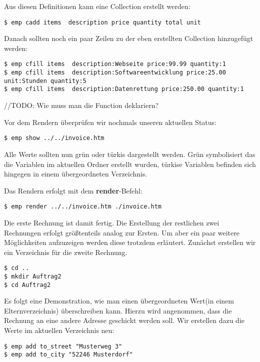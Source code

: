 Aus diesen Definitionen kann eine Collection erstellt werden:
\begin{lstlisting}[style=Bash]
$ emp cadd items  description price quantity total unit
\end{lstlisting}

Danach sollten noch ein paar Zeilen zu der eben erstellten Collection hinzugefügt werden:
\begin{lstlisting}[style=Bash]
$ emp cfill items  description:Webseite price:99.99 quantity:1
$ emp cfill items  description:Softwareentwicklung price:25.00 unit:Stunden quantity:5
$ emp cfill items  description:Datenrettung price:250.00 quantity:1
\end{lstlisting}
//TODO: Wie muss man die Function deklariern?

Vor dem Rendern überprüfen wir nochmals unseren aktuellen Status:
\begin{lstlisting}[style=Bash]
$ emp show ../../invoice.htm
\end{lstlisting}
Alle Werte sollten nun grün oder türkis dargestellt werden. Grün symbolisiert das die Variablen im aktuellen Ordner erstellt wurden, türkise Variablen befinden sich hingegen in einem übergeordneten Verzeichnis.

Das Rendern erfolgt mit dem \textbf{render}-Befehl:
\begin{lstlisting}[style=Bash]
$ emp render ../../invoice.htm ./invoice.htm
\end{lstlisting}

Die erste Rechnung ist damit fertig. Die Erstellung der restlichen zwei Rechnungen erfolgt größtenteils analog zur Ersten. Um aber ein paar weitere Möglichkeiten aufzuzeigen werden diese trotzdem erläutert.
Zunächst erstellen wir ein Verzeichnis für die zweite Rechnung.

\begin{lstlisting}[style=Bash]
$ cd ..
$ mkdir Auftrag2
$ cd Auftrag2
\end{lstlisting}

Es folgt eine Demonstration, wie man einen übergeordneten Wert(in einem Elternverzeichnis) überschreiben kann. Hierzu wird angenommen, dass die Rechnung an eine andere Adresse geschickt werden soll. Wir erstellen dazu die Werte im aktuellen Verzeichnis neu:

\begin{lstlisting}[style=Bash]
$ emp add to_street "Musterweg 3"
$ emp add to_city "52246 Musterdorf"
\end{lstlisting}

